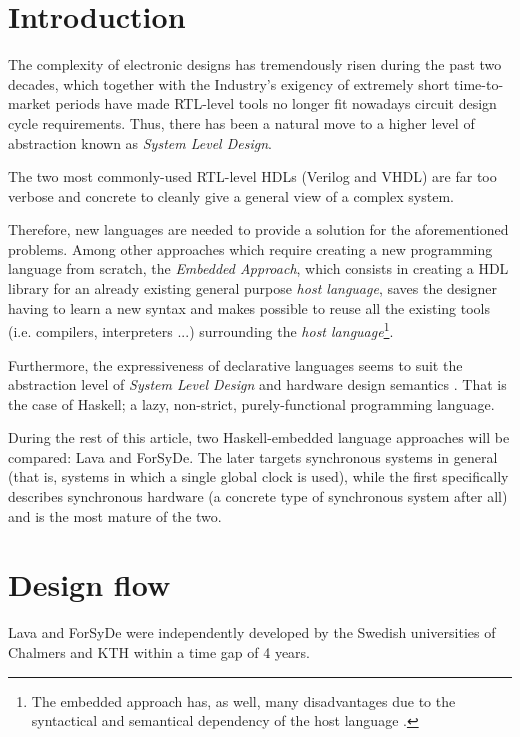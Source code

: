 \documentclass[a4paper,twoside,11pt]{article}
\begin{document}
\begin{body}
  \section{Introduction}
  The complexity of electronic designs has tremendously risen during the past
  two decades, which together with the Industry's exigency of extremely
  short time-to-market periods have made RTL-level tools no longer fit
  nowadays circuit design cycle requirements. Thus, there has been a
  natural move to a higher level of abstraction known as
  \textit{System Level Design}.

  The two most commonly-used RTL-level HDLs (Verilog and VHDL) are far
  too verbose and concrete to cleanly give a general view of a
  complex system.

  Therefore, new languages are needed to provide a solution for the
  aforementioned problems.  Among other approaches which require
  creating a new programming language from scratch, the
  \textit{Embedded Approach}, which consists in creating a HDL library
  for an already existing general purpose \textit{host language},
  saves the designer having to learn a new syntax and makes possible
  to reuse all the existing tools (i.e.  compilers, interpreters ...)
  surrounding the \textit{host language}\footnote{The embedded
    approach has, as well, many disadvantages due to the syntactical
    and semantical dependency of the host language \cite{another}.}.

  Furthermore, the expressiveness of declarative languages seems to
  suit the abstraction level of \textit{System Level Design}
  \cite{declarative} and hardware design semantics \cite{funhw}. That
  is the case of Haskell\cite{haskell}; a lazy, non-strict,
  purely-functional programming language.

  During the rest of this article, two Haskell-embedded language
  approaches will be compared: Lava\cite{lava} and
  ForSyDe\cite{forsyde}. The later targets synchronous systems in
  general (that is, systems in which a single global clock is
  used\footnotemark {}), while the first specifically describes
  synchronous hardware (a concrete type of synchronous system after
  all) and is the most mature of the two.
  
\section{Design flow}
Lava and ForSyDe were independently developed by the Swedish
universities of Chalmers and KTH within a time gap of 4 years.


\end{body}
\end{document}
